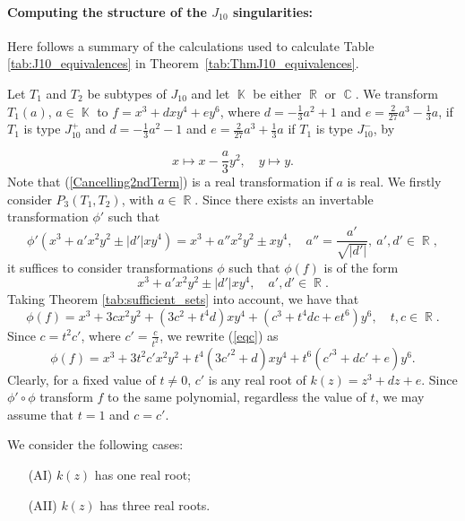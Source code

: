 \documentclass[noend]{amsproc}
\theoremstyle{definition}
\DeclareMathOperator{\R}{\mathbb{R}}
\DeclareMathOperator{\C}{\mathbb{C}}
\DeclareMathOperator{\K}{\mathbb{K}}
\begin{document}
\paragraph{\bf Computing the structure of the $J_{10}$ singularities:}Here follows a summary of the calculations used to calculate Table \ref{tab:J10_equivalences} in Theorem~\ref{tab:ThmJ10_equivalences}.

Let $T_1$ and $T_2$ be subtypes of $J_{10}$ and let $\K$ be either $\R$ or $\C$.  We transform $T_1(a)$, $a\in\K$ to  $f=x^3+dxy^4+ey^6$, where $d=-\frac{1}{3}a^2+1$ and $e=\frac{2}{27}a^3-\frac{1}{3}a$, if $T_1$ is type $J_{10}^+$ and $d=-\frac{1}{3}a^2-1$ and $e=\frac{2}{27}a^3+\frac{1}{3}a$ if $T_1$ is type $J_{10}^-$, by 

\begin{equation}\label{Cancelling2ndTerm}
x\mapsto x-\frac{a}{3}y^2,\quad y\mapsto y.
\end{equation}
Note that (\ref{Cancelling2ndTerm}) is a real transformation if $a$ is real.
We firstly consider $P_3(T_1,T_2)$, with $a\in\R$. Since  there exists an invertable transformation $\phi'$ such that
\begin{equation}\label{phi'}
\phi'(x^3+a'x^2y^2\pm |d'|xy^4)=x^3+a''x^2y^2\pm xy^4,\quad a''=\frac{a'}{\sqrt{|d'|}},\  a',d'\in \R,
\end{equation}
it suffices to consider transformations $\phi$ such that $\phi(f)$ is of the form 
\begin{equation}\label{form}
x^3+a'x^2y^2\pm |d'|xy^4,\quad a',d'\in \R.
\end{equation}
Taking Theorem \ref{tab:sufficient_sets} into account, we have that
\begin{equation}\label{eqc}
\phi(f)=x^3+3cx^2y^2+(3c^2+t^4d)xy^4+(c^3+t^4dc+et^6)y^6,\quad t,c\in\R.
\end{equation}
Since $c=t^2c'$, where $c'=\frac{c}{t^2}$, we rewrite (\ref{eqc}) as
\begin{equation}\label{eqc'}
\phi(f)=x^3+3t^2c'x^2y^2+t^4(3c'^2+d)xy^4+t^6(c'^3+dc'+e)y^6.
\end{equation}
Clearly, for a fixed value of $t\neq 0$, $c'$ is any real root of $k(z)=z^3+dz+e$. Since $\phi'\circ\phi$ transform $f$ to the same polynomial, regardless the value of $t$, we may assume that $t=1$ and $c=c'$. 

We consider the following cases:
\begin{itemize}
\item[(AI)]$k(z)$ has one real root;
\item[(AII)]$k(z)$ has three real roots.
\end{itemize}
\end{document}
